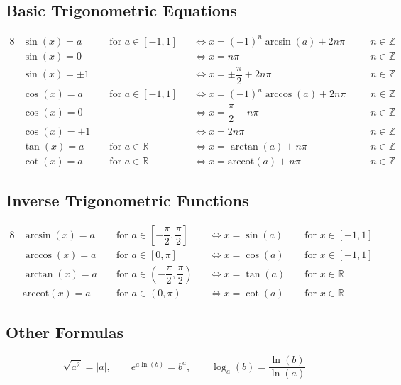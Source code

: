 \documentclass[a4paper,12pt,openany]{book}
\begin{document}
\subsection{Basic Trigonometric Equations}
\begin{alignat*}{8}
    &\sin(x) = a 
    &&\text{ for } a \in [-1, 1]
    &&\Leftrightarrow x =(-1)^n\arcsin(a) + 2n\pi\quad 
    &&n \in \mathbb{Z} \\
    &\sin(x) = 0 
    &&
    &&\Leftrightarrow x = n\pi 
    &&n \in \mathbb{Z} \\
    &\sin(x) = \pm 1 &&
    &&\Leftrightarrow x = \pm\dfrac{\pi}{2} + 2n\pi
    &&n \in \mathbb{Z} \\
    &\cos(x) = a 
    &&\text{ for } a \in [-1, 1]
    &&\Leftrightarrow x =(-1)^n\arccos(a) + 2n\pi 
    &&n \in \mathbb{Z} \\
    &\cos(x) = 0
    &&
    &&\Leftrightarrow x = \dfrac{\pi}{2} + n\pi
    &&n \in \mathbb{Z} \\
    &\cos(x) = \pm 1
    &&
    &&\Leftrightarrow x = 2n\pi
    &&n \in \mathbb{Z} \\
    &\tan(x) = a
    &&\text{ for } a \in \mathbb{R}
    &&\Leftrightarrow x = \arctan(a) + n\pi
    &&n \in \mathbb{Z} \\
    &\cot(x) = a
    &&\text{ for } a \in \mathbb{R}
    &&\Leftrightarrow x = \text{arccot}(a) + n\pi
    &&n \in \mathbb{Z}
\end{alignat*}
    
\subsection{Inverse Trigonometric Functions}

\begin{alignat*}{8}
    &\arcsin(x) = a
    &&\text{ for } a \in [-\dfrac{\pi}{2}, \dfrac{\pi}{2}]
    &&\Leftrightarrow x = \sin(a)
    &&\text{ for } x \in [-1, 1] \\
    &\arccos(x) = a
    &&\text{ for } a \in [0, \pi]
    &&\Leftrightarrow x = \cos(a)
    &&\text{ for } x \in [-1, 1] \\
    &\arctan(x) = a
    &&\text{ for } a \in (-\dfrac{\pi}{2}, \dfrac{\pi}{2})
    &&\Leftrightarrow x = \tan(a)
    &&\text{ for } x \in \mathbb{R} \\
    &\text{arccot}(x) = a
    &&\text{ for } a \in (0, \pi)
    &&\Leftrightarrow x = \cot(a)
    &&\text{ for } x \in \mathbb{R}
\end{alignat*}

\subsection{Other Formulas}
\[
    \sqrt{a^2} = |a|, \qquad e^{a\ln(b)} = b^a, \qquad \log_a(b) = \dfrac{\ln(b)}{\ln(a)}
\]
\pagebreak
\end{document}
